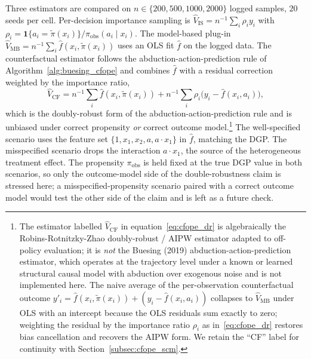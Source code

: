 Three estimators are compared on $n \in \{200, 500, 1000, 2000\}$ logged samples, $20$ seeds per cell. Per-decision importance sampling is $\widehat V_{\mathrm{IS}} = n^{-1} \sum_i \rho_i y_i$ with $\rho_i = \mathbf 1\{a_i = \widetilde\pi(x_i)\} / \pi_{\mathrm{obs}}(a_i \mid x_i)$. The model-based plug-in $\widehat V_{\mathrm{MB}} = n^{-1} \sum_i \hat f(x_i, \widetilde\pi(x_i))$ uses an OLS fit $\hat f$ on the logged data. The counterfactual estimator follows the abduction-action-prediction rule of Algorithm~\ref{alg:buesing_cfope} and combines $\hat f$ with a residual correction weighted by the importance ratio,
\begin{equation}
\widehat V_{\mathrm{CF}}
= n^{-1} \sum_i \hat f(x_i, \widetilde\pi(x_i))
  + n^{-1} \sum_i \rho_i \bigl(y_i - \hat f(x_i, a_i)\bigr),
\label{eq:cfope_dr}
\end{equation}
which is the doubly-robust form of the abduction-action-prediction rule and is unbiased under correct propensity \emph{or} correct outcome model.\footnote{The estimator labelled $\widehat V_{\mathrm{CF}}$ in equation~\eqref{eq:cfope_dr} is algebraically the Robins-Rotnitzky-Zhao doubly-robust / AIPW estimator adapted to off-policy evaluation; it is \emph{not} the Buesing (2019) abduction-action-prediction estimator, which operates at the trajectory level under a known or learned structural causal model with abduction over exogenous noise and is not implemented here. The naive average of the per-observation counterfactual outcome $y'_i = \hat f(x_i, \widetilde\pi(x_i)) + (y_i - \hat f(x_i, a_i))$ collapses to $\widehat V_{\mathrm{MB}}$ under OLS with an intercept because the OLS residuals sum exactly to zero; weighting the residual by the importance ratio $\rho_i$ as in~\eqref{eq:cfope_dr} restores bias cancellation and recovers the AIPW form. We retain the ``CF'' label for continuity with Section~\ref{subsec:cfope_scm}.} The well-specified scenario uses the feature set $\{1, x_1, x_2, a, a \cdot x_1\}$ in $\hat f$, matching the DGP. The misspecified scenario drops the interaction $a \cdot x_1$, the source of the heterogeneous treatment effect. The propensity $\pi_{\mathrm{obs}}$ is held fixed at the true DGP value in both scenarios, so only the outcome-model side of the double-robustness claim is stressed here; a misspecified-propensity scenario paired with a correct outcome model would test the other side of the claim and is left as a future check.

\begin{table}[h]
\centering
\caption{Counterfactual off-policy evaluation under a linear SCM, $n = 1000$, $20$ seeds. The CF estimator's residual correction cancels the MB bias under misspecification while inheriting low variance from the model.}
\label{tab:cfope_summary}

\end{table}

